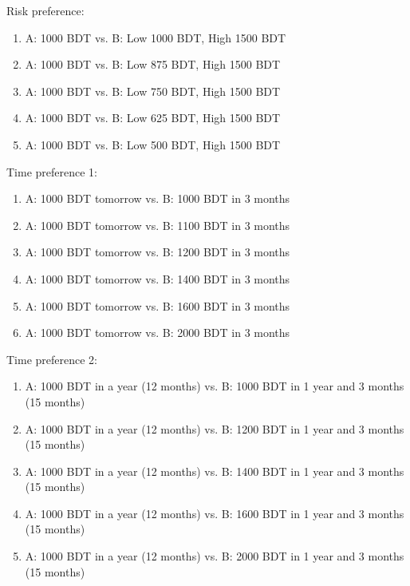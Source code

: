 \setlength{\parindent}{1em}
\vspace{2ex}


Risk preference:
\begin{enumerate}
\vspace{1.0ex}\setlength{\itemsep}{1.0ex}\setlength{\baselineskip}{12pt}
\item	A: 1000 BDT  vs. B: Low 1000 BDT, High 1500 BDT
\item	A: 1000 BDT  vs. B: Low 875 BDT, High 1500 BDT
\item	A: 1000 BDT  vs. B: Low 750 BDT, High 1500 BDT
\item	A: 1000 BDT  vs. B: Low 625 BDT, High 1500 BDT
\item	A: 1000 BDT  vs. B: Low 500 BDT, High 1500 BDT
\end{enumerate}
Time preference 1:
\begin{enumerate}
\vspace{1.0ex}\setlength{\itemsep}{1.0ex}\setlength{\baselineskip}{12pt}
\item	A: 1000 BDT tomorrow vs. B: 1000 BDT in 3 months
\item	A: 1000 BDT tomorrow vs. B: 1100 BDT in 3 months
\item	A: 1000 BDT tomorrow vs. B: 1200 BDT in 3 months   
\item	A: 1000 BDT tomorrow vs. B: 1400 BDT in 3 months
\item	A: 1000 BDT tomorrow vs. B: 1600 BDT in 3 months   
\item	A: 1000 BDT tomorrow vs. B: 2000 BDT in 3 months  
\end{enumerate}
Time preference 2:
\begin{enumerate}
\vspace{1.0ex}\setlength{\itemsep}{1.0ex}\setlength{\baselineskip}{12pt}
\item	A: 1000 BDT in a year (12 months) vs. B: 1000 BDT in 1 year and 3 months (15 months)
\item	A: 1000 BDT in a year (12 months) vs. B: 1200 BDT in 1 year and 3 months (15 months)   
\item	A: 1000 BDT in a year (12 months) vs. B: 1400 BDT in 1 year and 3 months (15 months)
\item	A: 1000 BDT in a year (12 months) vs. B: 1600 BDT in 1 year and 3 months (15 months)
\item	A: 1000 BDT in a year (12 months) vs. B: 2000 BDT in 1 year and 3 months (15 months)
\end{enumerate}

